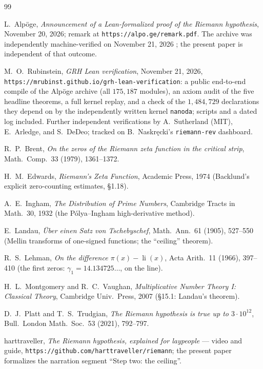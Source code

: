 \documentclass[11pt]{amsart}
\numberwithin{equation}{section}
\begin{document}
\begin{thebibliography}{99}

 L.~Alp\"oge, \emph{Announcement of a Lean-formalized
proof of the Riemann hypothesis}, November 20, 2026; remark at
\texttt{https://alpo.ge/remark.pdf}. The archive was independently
machine-verified on November 21, 2026 \cite{Rub26v}; the present paper
is independent of that outcome.

 M.~O.~Rubinstein, \emph{GRH Lean verification},
November 21, 2026,
\texttt{https://mrubinst.github.io/grh-lean-verification}: a public
end-to-end compile of the Alp\"oge archive (all $175{,}187$ modules),
an axiom audit of the five headline theorems, a full kernel replay,
and a check of the $1{,}484{,}729$ declarations they depend on by the
independently written kernel \texttt{nanoda}; scripts and a dated log
included. Further independent verifications by A.~Sutherland (MIT),
E.~Arledge, and S.~DeDeo; tracked on B.~Naskr\k{e}cki's
\texttt{riemann-rev} dashboard.

 R.~P.~Brent, \emph{On the zeros of the Riemann zeta
function in the critical strip}, Math.\ Comp.\ 33 (1979), 1361--1372.

 H.~M.~Edwards, \emph{Riemann's Zeta Function},
Academic Press, 1974 (Backlund's explicit zero-counting estimates,
\S1.18).

 A.~E.~Ingham, \emph{The Distribution of Prime
Numbers}, Cambridge Tracts in Math.\ 30, 1932 (the
P\'olya--Ingham high-derivative method).

 E.~Landau, \emph{\"Uber einen Satz von Tschebyschef},
Math.\ Ann.\ 61 (1905), 527--550 (Mellin transforms of one-signed
functions; the ``ceiling'' theorem).

 R.~S.~Lehman, \emph{On the difference $\pi(x) -
\operatorname{li}(x)$}, Acta Arith.\ 11 (1966), 397--410 (the first
zeros: $\gamma_1 = 14.134725\ldots$, on the line).

 H.~L.~Montgomery and R.~C.~Vaughan, \emph{
Multiplicative Number Theory I: Classical Theory}, Cambridge Univ.\
Press, 2007 (\S15.1: Landau's theorem).

 D.~J.~Platt and T.~S.~Trudgian, \emph{The Riemann
hypothesis is true up to $3\cdot 10^{12}$}, Bull.\ London Math.\ Soc.\ 53
(2021), 792--797.

 harttraveller, \emph{The Riemann hypothesis,
explained for laypeople} --- video and guide,
\texttt{https://github.com/harttraveller/riemann}; the present paper
formalizes the narration segment ``Step two: the ceiling''.


\end{thebibliography}
\end{document}
